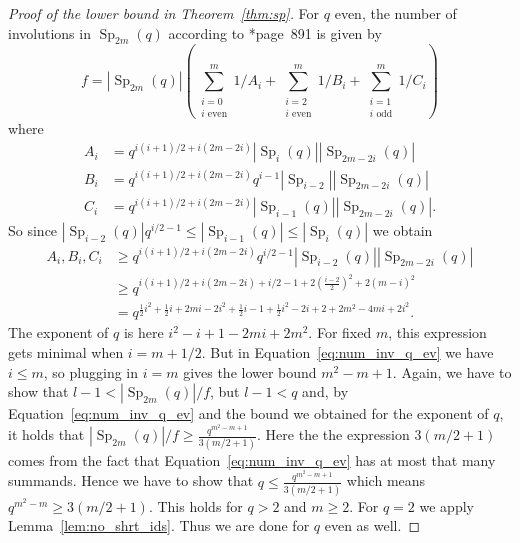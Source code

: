 \documentclass[a4paper,11pt]{amsproc}
\newcommand{\card}[1]{\left\lvert#1\right\rvert}%
\DeclareMathOperator{\Sp}{Sp}%
\theoremstyle{plain}
\theoremstyle{definition}
\begin{document}
\begin{proof}[Proof of the lower bound in Theorem~\ref{thm:sp}]
		For $q$ even, the number of involutions in $\Sp_{2m}(q)$ according to \cite{fulmanguralnickstanton2017asymptotics}*{page~891} is given by
		\begin{equation}\label{eq:num_inv_q_ev}
			f=\card{\Sp_{2m}(q)}\left(\sum_{\substack{i=0\\ \text{$i$ even}}}^m{1/A_i}+\sum_{\substack{i=2\\ \text{$i$ even}}}^m{1/B_i}+\sum_{\substack{i=1\\ \text{$i$ odd}}}^m{1/C_i}\right)
		\end{equation}
		where
		\begin{align*}
			A_i &= q^{i(i+1)/2+i(2m-2i)}\card{\Sp_i(q)}\card{\Sp_{2m-2i}(q)}\\
			B_i &= q^{i(i+1)/2+i(2m-2i)}q^{i-1}\card{\Sp_{i-2}}\card{\Sp_{2m-2i}(q)}\\
			C_i &= q^{i(i+1)/2+i(2m-2i)}\card{\Sp_{i-1}(q)}\card{\Sp_{2m-2i}(q)}.
		\end{align*}
		So since $\card{\Sp_{i-2}(q)}q^{i/2-1}\leq\card{\Sp_{i-1}(q)}\leq\card{\Sp_{i}(q)}$ we obtain
		\begin{align*}
			A_i,B_i,C_i &\geq q^{i(i+1)/2+i(2m-2i)}q^{i/2-1}\card{\Sp_{i-2}(q)}\card{\Sp_{2m-2i}(q)}\\
			&\geq q^{i(i+1)/2+i(2m-2i)+i/2-1+2(\frac{i-2}{2})^2 +2(m-i)^2}\\
			&= q^{\frac{1}{2}i^2+\frac{1}{2}i+2mi-2i^2+\frac{1}{2}i-1+\frac{1}{2}i^2-2i+2+2m^2-4mi+2i^2}.
		\end{align*}
		The exponent of $q$ is here $i^2-i+1-2mi+2m^2.$ For fixed $m$, this expression gets minimal when $i=m+1/2$. But in Equation~\eqref{eq:num_inv_q_ev} we have $i\leq m$, so plugging in $i=m$ gives the lower bound $m^2-m+1$. Again, we have to show that $l-1<\card{\Sp_{2m}(q)}/f$, but $l-1<q$ and, by Equation~\eqref{eq:num_inv_q_ev} and the bound we obtained for the exponent of $q$, it holds that $\card{\Sp_{2m}(q)}/f\geq\frac{q^{m^2-m+1}}{3(m/2+1)}$. Here the the expression $3(m/2+1)$ comes from the fact that Equation~\eqref{eq:num_inv_q_ev} has at most that many summands. Hence we have to show that $q\leq\frac{q^{m^2-m+1}}{3(m/2+1)}$ which means $q^{m^2-m}\geq 3(m/2+1)$. This holds for $q>2$ and $m\geq2$. For $q=2$ we apply Lemma~\ref{lem:no_shrt_ids}. Thus we are done for $q$ even as well.
	\end{proof}
	
\end{document}
